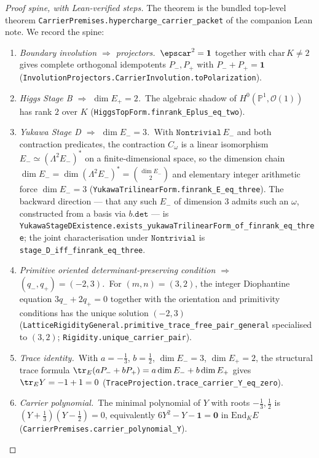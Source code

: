 \begin{proof}[Proof spine, with Lean-verified steps]
The theorem is the bundled top-level theorem
\texttt{CarrierPremises.hypercharge\_carrier\_packet} of the
companion Lean note. We record the spine:

\begin{enumerate}[label=(S\arabic*), leftmargin=2em, itemsep=2pt]
    \item \emph{Boundary involution $\Rightarrow$ projectors.}\
        $\epscar^2 = \mathbf 1$ together with
        $\mathrm{char}\,K \ne 2$ gives complete orthogonal
        idempotents $P_-, P_+$ with $P_- + P_+ = \mathbf 1$
        (\texttt{InvolutionProjectors.CarrierInvolution.toPolarization}).
    \item \emph{Higgs Stage B $\Rightarrow$ $\dim E_+ = 2$.}\ The
        algebraic shadow of $H^0(\mathbb P^1, \mathcal O(1))$ has
        rank $2$ over $K$ (\texttt{HiggsTopForm.finrank\_Eplus\_eq\_two}).
    \item \emph{Yukawa Stage D $\Rightarrow$ $\dim E_- = 3$.}\ With
        $\texttt{Nontrivial}\,E_-$ and both contraction predicates,
        the contraction $C_\omega$ is a linear isomorphism
        $E_- \simeq (\Lambda^2 E_-)^*$ on a finite-dimensional space,
        so the dimension chain
        $\dim E_- = \dim(\Lambda^2 E_-)^* = \binom{\dim E_-}{2}$
        and elementary integer arithmetic force
        $\dim E_- = 3$
        (\texttt{YukawaTrilinearForm.finrank\_E\_eq\_three}).
        The backward direction --- that any such $E_-$ of dimension
        $3$ admits such an $\omega$, constructed from a basis via
        $b.\texttt{det}$ --- is
        \texttt{YukawaStageDExistence.exists\_yukawaTrilinearForm\_of\_finrank\_eq\_three};
        the joint characterisation under $\texttt{Nontrivial}$ is
        \texttt{stage\_D\_iff\_finrank\_eq\_three}.
    \item \emph{Primitive oriented determinant-preserving condition
        $\Rightarrow$ $(q_-, q_+) = (-2, 3)$.}\ For $(m, n) = (3, 2)$,
        the integer Diophantine equation
        $3 q_- + 2 q_+ = 0$ together with the orientation and
        primitivity conditions has the unique solution
        $(-2, 3)$
        (\texttt{LatticeRigidityGeneral.primitive\_trace\_free\_pair\_general}
        specialised to $(3, 2)$;
        \texttt{Rigidity.unique\_carrier\_pair}).
    \item \emph{Trace identity.}\ With $a = -\tfrac13$, $b = \tfrac12$,
        $\dim E_- = 3$, $\dim E_+ = 2$, the structural trace formula
        $\tr_E (a P_- + b P_+) = a \dim E_- + b \dim E_+$ gives
        $\tr_E Y = -1 + 1 = 0$
        (\texttt{TraceProjection.trace\_carrier\_Y\_eq\_zero}).
    \item \emph{Carrier polynomial.}\ The minimal polynomial of $Y$
        with roots $-\tfrac13, \tfrac12$ is
        $\left(Y + \tfrac13\right)\left(Y - \tfrac12\right) = 0$,
        equivalently $6 Y^2 - Y - \mathbf 1 = \mathbf 0$
        in $\mathrm{End}_K E$
        (\texttt{CarrierPremises.carrier\_polynomial\_Y}).
\end{enumerate}


\end{proof}
